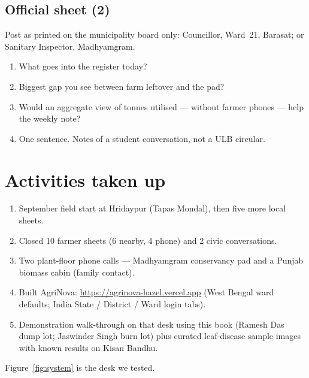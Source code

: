 \documentclass[12pt,a4paper]{article}
\begin{document}
\subsection{Official sheet (2)}
Post as printed on the municipality board only: Councillor, Ward~21, Barasat; or Sanitary Inspector, Madhyamgram.
\begin{enumerate}[leftmargin=1.5em]
  \item What goes into the register today?
  \item Biggest gap you see between farm leftover and the pad?
  \item Would an aggregate view of tonnes utilised --- without farmer phones --- help the weekly note?
  \item One sentence. Notes of a student conversation, not a ULB circular.
\end{enumerate}

\section{Activities taken up}
\begin{enumerate}
  \item September field start at Hridaypur (Tapas Mondal), then five more local sheets.
  \item Closed 10 farmer sheets (6 nearby, 4 phone) and 2 civic conversations.
  \item Two plant-floor phone calls --- Madhyamgram conservancy pad and a Punjab biomass cabin (family contact).
  \item Built AgriNova: \url{https://agrinova-hazel.vercel.app} (West Bengal ward defaults; India State / District / Ward login tabs).
  \item Demonstration walk-through on that desk using this book (Ramesh Das dump lot; Jaswinder Singh burn lot) plus curated leaf-disease sample images with known results on Kisan Bandhu.
\end{enumerate}

Figure~\ref{fig:system} is the desk we tested.
\end{document}
